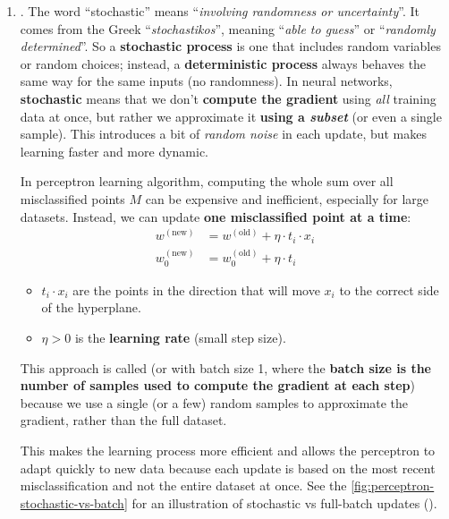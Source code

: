 \begin{enumerate}
    \item {}.\label{def:stochastic-gradient-descent} The word ``stochastic'' means ``\emph{involving randomness or uncertainty}''. It comes from the Greek ``\emph{stochastikos}'', meaning ``\emph{able to guess}'' or ``\emph{randomly determined}''. So a \textbf{stochastic process} is one that includes random variables or random choices; instead, a \textbf{deterministic process} always behaves the same way for the same inputs (no randomness). In neural networks, \textbf{stochastic} means that we don't \textbf{compute the gradient} using \emph{all} training data at once, but rather we approximate it \textbf{using a \emph{subset}} (or even a single sample). This introduces a bit of \emph{random noise} in each update, but makes learning faster and more dynamic.
    
    In perceptron learning algorithm, computing the whole sum over all misclassified points $M$ can be expensive and inefficient, especially for large datasets. Instead, we can update \textbf{one misclassified point at a time}:
    \begin{align*}
        w^{\left(\text{new}\right)} &= w^{\left(\text{old}\right)} + \eta \cdot t_i \cdot x_i \\[.3em]
        w_0^{\left(\text{new}\right)} &= w_0^{\left(\text{old}\right)} + \eta \cdot t_i
    \end{align*}
    \begin{itemize}
        \item $t_i \cdot x_i$ are the points in the direction that will move $x_i$ to the correct side of the hyperplane.
        \item $\eta > 0$ is the \textbf{learning rate} (small step size).
    \end{itemize}
    This approach is called  (or\break {} with batch size 1, where the \textbf{batch size is the number of samples used to compute the gradient at each step}) because we use a single (or a few) random samples to approximate the gradient, rather than the full dataset.
    
    This makes the learning process more efficient and allows the perceptron to adapt quickly to new data because each update is based on the most recent misclassification and not the entire dataset at once. See the \autoref{fig:perceptron-stochastic-vs-batch} for an illustration of stochastic vs full-batch updates ().



\end{enumerate}
